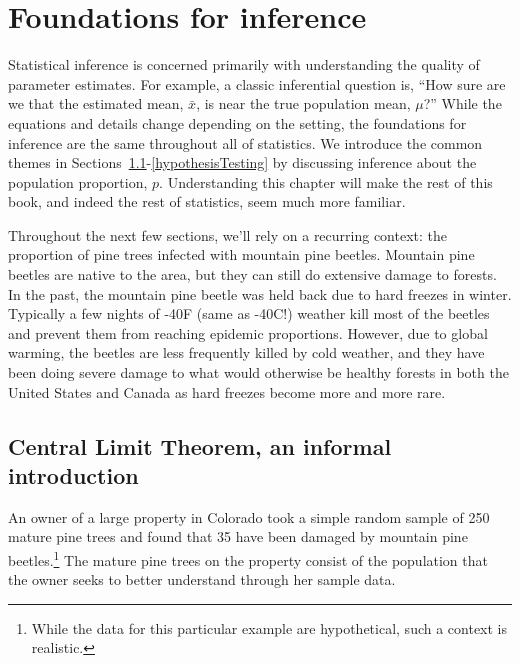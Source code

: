 
\chapter{Foundations for inference}
\label{foundationsForInference}

Statistical inference is concerned primarily with understanding the quality of parameter estimates. For example, a classic inferential question is, ``How sure are we that the estimated mean, $\bar{x}$, is near the true population mean, $\mu$?'' While the equations and details change depending on the setting, the foundations for inference are the same throughout all of statistics. We introduce the common themes in Sections~\ref{CLTInformalSection}-\ref{hypothesisTesting} by discussing inference about the population proportion, $p$. Understanding this chapter will make the rest of this book, and indeed the rest of statistics, seem much more familiar.

Throughout the next few sections, we'll rely on a recurring context: the proportion of pine trees infected with mountain pine beetles. Mountain pine beetles are native to the area, but they can still do extensive damage to forests. In the past, the mountain pine beetle was held back due to hard freezes in winter. Typically a few nights of -40\degree F (same as -40\degree C!) weather kill most of the beetles and prevent them from reaching epidemic proportions. However, due to global warming, the beetles are less frequently killed by cold weather, and they have been doing severe damage to what would otherwise be healthy forests in both the United States and Canada as hard freezes become more and more rare.


\section{Central Limit Theorem, an informal introduction}
\label{CLTInformalSection}



An owner of a large property in Colorado took a simple random sample of 250 mature pine trees and found that 35 have been damaged by mountain pine beetles.\footnote{While the data for this particular example are hypothetical, such a context is realistic.} The mature pine trees on the property consist of the population that the owner seeks to better understand through her sample data.

